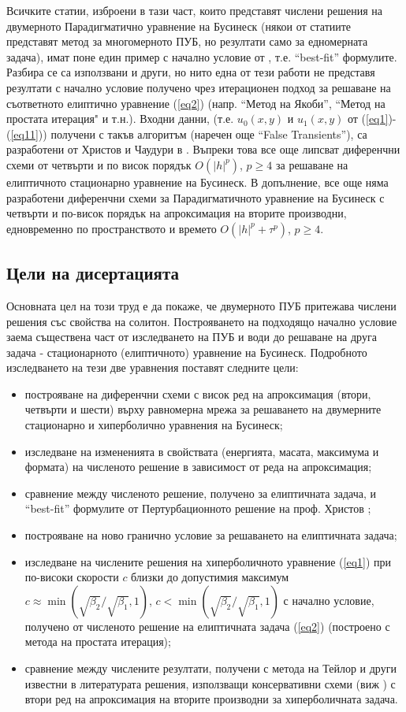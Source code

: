 \documentclass[a5paper]{article}
\newcommand{\rf}[1]{(\ref{#1})}
\theoremstyle{remark}
\begin{document}
\begin{normalsize}
Всичките статии, изброени в тази част, които представят числени решения на двумерното Парадигматично уравнение на Бусинеск (някои от статиите представят метод за многомерното ПУБ, но резултати само за едномерната задача), имат поне един пример с начално условие от \cite{ref15}, т.е. ``best-fit'' формулите. Разбира се са използвани и други, но нито една от тези работи не представя резултати с начално условие получено чрез итерационен подход за решаване на съответното елиптично уравнение \rf{eq2} (напр. ``Метод на Якоби'', ``Метод на простата итерация" и т.н.). Входни данни, (т.е. $u_0(x,y)$ и $u_1(x,y)$ от \rf{eq1}-\rf{eq11}) получени с такъв алгоритъм (наречен още ``False Transients''), са разработени от Христов и Чаудури в \cite{ref117,ref116}. Въпреки това все още липсват диференчни схеми от четвърти и по висок порядък $O(|h|^p)$, $p \ge 4$ за решаване на елиптичното стационарно уравнение на Бусинеск. В допълнение, все още няма разработени диференчни схеми за Парадигматичното уравнение на Бусинеск с четвърти и по-висок порядък на апроксимация на вторите производни, едновременно по пространството и времето $O(|h|^p + \tau^p)$, $p \ge 4$.

\subsection{Цели на дисертацията}
Основната цел на този труд е да покаже, че двумерното ПУБ притежава числени решения със свойства на солитон. Построяването на подходящо начално условие заема съществена част от изследването на ПУБ и води до решаване на друга задача - стационарното (елиптичното) уравнение на Бусинеск. Подробното изследването на тези две уравнения поставят следните цели:
\begin{itemize}
  \item построяване на диференчни схеми с висок ред на апроксимация (втори, четвърти и шести) върху равномерна мрежа за решаването на двумерните стационарно и хиперболично уравнения на Бусинеск;
  \item изследване на измененията в свойствата (енергията, масата, максимума и формата) на численото решение в зависимост от реда на апроксимация;
  \item сравнение между численото решение, получено за елиптичната задача, и ``best-fit'' формулите от Пертурбационното решение на проф. Христов \cite{ref15};
  \item построяване на ново гранично условие за решаването на елиптичната задача;
  \item изследване на числените решения на хиперболичното уравнение \rf{eq1} при по-високи скорости $c$ близки до допустимия максимум $c \approx \min (\sqrt{\beta_2}/ \sqrt{\beta_1},1)$, $c < \min (\sqrt{\beta_2}/ \sqrt{\beta_1},1)$ с начално условие, получено от численото решение на елиптичната задача \rf{eq2} (построено с метода на простата итерация);
  \item сравнение между числените резултати, получени с метода на Тейлор и други известни в литературата решения, използващи консервативни схеми (виж \cite{ref20, ref23}) с втори ред на апроксимация на вторите производни за хиперболичната задача.
\end{itemize}
 

\end{normalsize}
\end{document}
